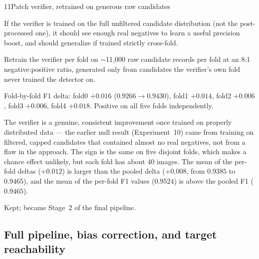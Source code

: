 \begin{explog}{11}{Patch verifier, retrained on generous raw candidates}
\item[Hypothesis] If the verifier is trained on the full unfiltered candidate distribution (not the post-processed one), it should see enough real negatives to learn a useful precision boost, and should generalize if trained strictly cross-fold.
\item[Method] Retrain the verifier per fold on $\sim$11{,}000 raw candidate records per fold at an 8:1 negative:positive ratio, generated only from candidates the verifier's own fold never trained the detector on.
\item[Result] Fold-by-fold F1 delta: fold0 $+0.016$ ($0.9266\rightarrow0.9430$), fold1 $+0.014$, fold2 $+0.006$, fold3 $+0.006$, fold4 $+0.018$. Positive on all five folds independently.
\item[Inference] The verifier is a genuine, consistent improvement once trained on properly distributed data --- the earlier null result (Experiment~10) came from training on filtered, capped candidates that contained almost no real negatives, not from a flaw in the approach. The sign is the same on five disjoint folds, which makes a chance effect unlikely, but each fold has about 40 images. The mean of the per-fold deltas ($+0.012$) is larger than the pooled delta ($+0.008$, from $0.9385$ to $0.9465$), and the mean of the per-fold F1 values ($0.9524$) is above the pooled F1 ($0.9465$).
\item[Verdict] Kept; became Stage~2 of the final pipeline.
\end{explog}


\subsection{Full pipeline, bias correction, and target reachability}


